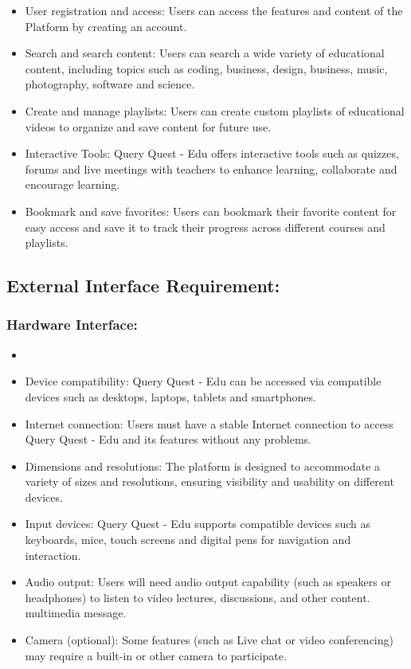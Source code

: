 \begin{itemize}
\item User registration and access: Users can access the features and content of the Platform by creating an account.

\item Search and search content: Users can search a wide variety of educational content, including topics such as coding, business, design, business, music, photography, software and science.

\item Create and manage playlists: Users can create custom playlists of educational videos to organize and save content for future use.

\item Interactive Tools: Query Quest - Edu offers interactive tools such as quizzes, forums and live meetings with teachers to enhance learning, collaborate and encourage learning.


\item Bookmark and save favorites: Users can bookmark their favorite content for easy access and save it to track their progress across different courses and playlists.
\end{itemize}

\subsection{External Interface Requirement:}
\subsubsection{Hardware Interface:}
\begin{itemize}
    \item 

\item Device compatibility: Query Quest - Edu can be accessed via compatible devices such as desktops, laptops, tablets and smartphones.

\item Internet connection: Users must have a stable Internet connection to access Query Quest - Edu and its features without any problems.

\item Dimensions and resolutions: The platform is designed to accommodate a variety of sizes and resolutions, ensuring visibility and usability on different devices.

\item Input devices: Query Quest - Edu supports compatible devices such as keyboards, mice, touch screens and digital pens for navigation and interaction.

\item Audio output: Users will need audio output capability (such as speakers or headphones) to listen to video lectures, discussions, and other content. multimedia message.

\item Camera (optional): Some features (such as Live chat or video conferencing) may require a built-in or other camera to participate.
\end{itemize}

